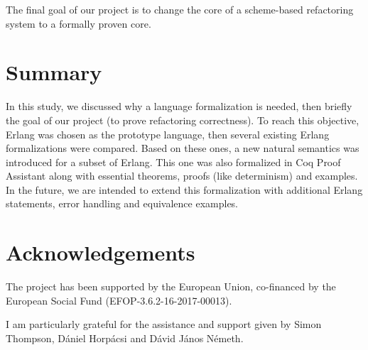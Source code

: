 \documentclass[12pt]{article}
\theoremstyle{definition}
\numberwithin{equation}{section}
\begin{document}
The final goal of our project is to change the core of a scheme-based refactoring system to a formally proven core.

\section{Summary}

In this study, we discussed why a language formalization is needed, then briefly the goal of our project (to prove refactoring correctness). To reach this objective, Erlang was chosen as the prototype language, then several existing Erlang formalizations were compared. Based on these ones, a new natural semantics was introduced for a subset of Erlang. This one was also formalized in Coq Proof Assistant along with essential theorems, proofs (like determinism) and examples. In the future, we are intended to extend this formalization with additional Erlang statements, error handling and equivalence examples.

\section*{Acknowledgements}

The project has been supported by the European Union, co-financed by the European Social  Fund  (EFOP-3.6.2-16-2017-00013).

I am particularly grateful for the assistance and support given by Simon Thompson, Dániel Horpácsi and Dávid János Németh.


{}

\end{document}

